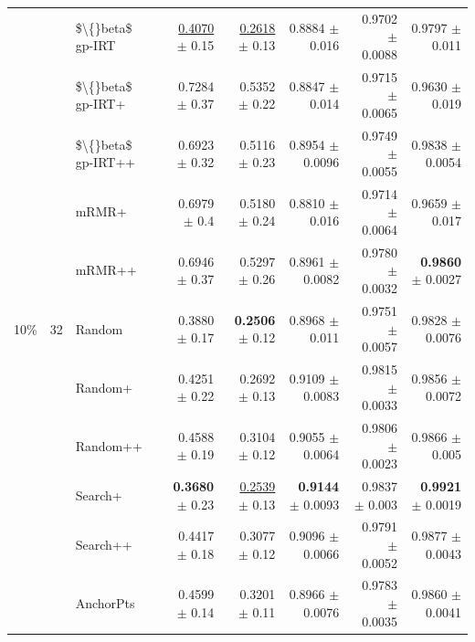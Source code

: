 \begin{longtable}{llp{}rrrrr}
 &  & \$\textbackslash\{\}beta\$ gp-IRT & \underline{0.4070} {\scriptsize $\pm$ 0.15} & \underline{0.2618} {\scriptsize $\pm$ 0.13} & 0.8884 {\scriptsize $\pm$ 0.016} & 0.9702 {\scriptsize $\pm$ 0.0088} & 0.9797 {\scriptsize $\pm$ 0.011} \\
 &  & \$\textbackslash\{\}beta\$ gp-IRT+ & 0.7284 {\scriptsize $\pm$ 0.37} & 0.5352 {\scriptsize $\pm$ 0.22} & 0.8847 {\scriptsize $\pm$ 0.014} & 0.9715 {\scriptsize $\pm$ 0.0065} & 0.9630 {\scriptsize $\pm$ 0.019} \\
 &  & \$\textbackslash\{\}beta\$ gp-IRT++ & 0.6923 {\scriptsize $\pm$ 0.32} & 0.5116 {\scriptsize $\pm$ 0.23} & 0.8954 {\scriptsize $\pm$ 0.0096} & 0.9749 {\scriptsize $\pm$ 0.0055} & 0.9838 {\scriptsize $\pm$ 0.0054} \\
 &  & mRMR+ & 0.6979 {\scriptsize $\pm$ 0.4} & 0.5180 {\scriptsize $\pm$ 0.24} & 0.8810 {\scriptsize $\pm$ 0.016} & 0.9714 {\scriptsize $\pm$ 0.0064} & 0.9659 {\scriptsize $\pm$ 0.017} \\
 &  & mRMR++ & 0.6946 {\scriptsize $\pm$ 0.37} & 0.5297 {\scriptsize $\pm$ 0.26} & 0.8961 {\scriptsize $\pm$ 0.0082} & 0.9780 {\scriptsize $\pm$ 0.0032} & \textbf{0.9860} {\scriptsize $\pm$ 0.0027} \\
\midrule
10\% & 32 & Random & 0.3880 {\scriptsize $\pm$ 0.17} & \textbf{0.2506} {\scriptsize $\pm$ 0.12} & 0.8968 {\scriptsize $\pm$ 0.011} & 0.9751 {\scriptsize $\pm$ 0.0057} & 0.9828 {\scriptsize $\pm$ 0.0076} \\
 &  & Random+ & 0.4251 {\scriptsize $\pm$ 0.22} & 0.2692 {\scriptsize $\pm$ 0.13} & 0.9109 {\scriptsize $\pm$ 0.0083} & 0.9815 {\scriptsize $\pm$ 0.0033} & 0.9856 {\scriptsize $\pm$ 0.0072} \\
 &  & Random++ & 0.4588 {\scriptsize $\pm$ 0.19} & 0.3104 {\scriptsize $\pm$ 0.12} & 0.9055 {\scriptsize $\pm$ 0.0064} & 0.9806 {\scriptsize $\pm$ 0.0023} & 0.9866 {\scriptsize $\pm$ 0.005} \\
 &  & Search+ & \textbf{0.3680} {\scriptsize $\pm$ 0.23} & \underline{0.2539} {\scriptsize $\pm$ 0.13} & \textbf{0.9144} {\scriptsize $\pm$ 0.0093} & 0.9837 {\scriptsize $\pm$ 0.003} & \textbf{0.9921} {\scriptsize $\pm$ 0.0019} \\
 &  & Search++ & 0.4417 {\scriptsize $\pm$ 0.18} & 0.3077 {\scriptsize $\pm$ 0.12} & 0.9096 {\scriptsize $\pm$ 0.0066} & 0.9791 {\scriptsize $\pm$ 0.0052} & 0.9877 {\scriptsize $\pm$ 0.0043} \\
 &  & AnchorPts & 0.4599 {\scriptsize $\pm$ 0.14} & 0.3201 {\scriptsize $\pm$ 0.11} & 0.8966 {\scriptsize $\pm$ 0.0076} & 0.9783 {\scriptsize $\pm$ 0.0035} & 0.9860 {\scriptsize $\pm$ 0.0041} \\

\end{longtable}
